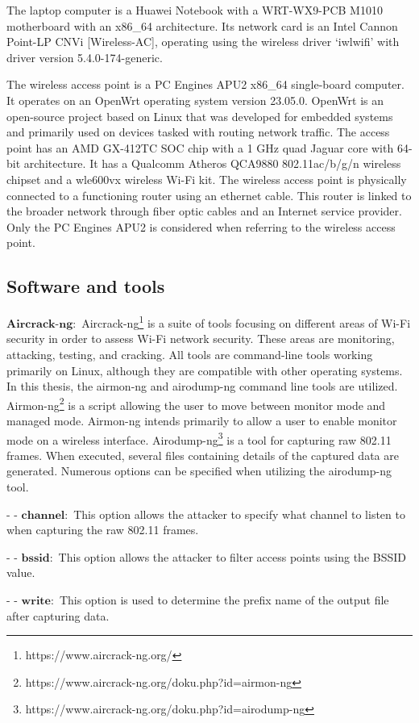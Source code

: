The laptop computer is a Huawei Notebook with a WRT-WX9-PCB M1010 motherboard with an x86_64 architecture. Its network card is an Intel Cannon Point-LP CNVi [Wireless-AC], operating using the wireless driver `iwlwifi' with driver version 5.4.0-174-generic.

The wireless access point is a PC Engines APU2 x86_64 single-board computer. It operates on an OpenWrt operating system version 23.05.0. OpenWrt is an open-source project based on Linux that was developed for embedded systems and primarily used on devices tasked with routing network traffic. The access point has an AMD GX-412TC SOC chip with a 1 GHz quad Jaguar core with 64-bit architecture. It has a Qualcomm Atheros QCA9880 802.11ac/b/g/n wireless chipset and a wle600vx wireless Wi-Fi kit. The wireless access point is physically connected to a functioning router using an ethernet cable. This router is linked to the broader network through fiber optic cables and an Internet service provider. Only the PC Engines APU2 is considered when referring to the wireless access point.

\subsection{Software and tools\label{subsec:software-methodology}}

$\mathbf{Aircrack\text{-}ng}:$ Aircrack-ng\footnote[1]{https://www.aircrack-ng.org/} is a suite of tools focusing on different areas of Wi-Fi security in order to assess Wi-Fi network security. These areas are monitoring, attacking, testing, and cracking. All tools are command-line tools working primarily on Linux, although they are compatible with other operating systems. In this thesis, the airmon-ng and airodump-ng command line tools are utilized. Airmon-ng\footnote[2]{https://www.aircrack-ng.org/doku.php?id=airmon-ng} is a script allowing the user to move between monitor mode and managed mode. Airmon-ng intends primarily to allow a user to enable monitor mode on a wireless interface. Airodump-ng\footnote[3]{https://www.aircrack-ng.org/doku.php?id=airodump-ng} is a tool for capturing raw 802.11 frames. When executed, several files containing details of the captured data are generated. Numerous options can be specified when utilizing the airodump-ng tool.

\begin{noitemize}
    \item $\textbf{- - channel}:$ This option allows the attacker to specify what channel to listen to when capturing the raw 802.11 frames.
    \item $\textbf{- - bssid}:$ This option allows the attacker to filter access points using the BSSID value.
    \item $\textbf{- - write}:$ This option is used to determine the prefix name of the output file after capturing data.
\end{noitemize}

